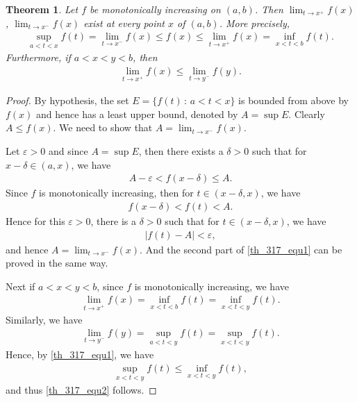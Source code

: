 \documentclass[11pt]{book}
\newtheorem{theorem}{Theorem}[chapter]
\theoremstyle{definition}
\numberwithin{equation}{chapter}
\begin{document}
\begin{theorem}\label{th_317}
Let $f$ be monotonically increasing on $(a,b)$. Then $\lim_{t \to x^{+}} f(x)$, $\lim_{t \to x^{-}} f(x)$ exist at every point $x$ of $(a,b)$. More precisely,
\begin{align}\label{th_317_equ1}
    \sup_{a < t < x} f(t) = \lim_{t \to x^-} f(x) \leq f(x) \leq \lim_{t \to x^+} f(x) = \inf_{x < t < b} f(t).
\end{align}
Furthermore, if $a < x < y < b$, then
\begin{align}\label{th_317_equ2}
    \lim_{t \to x^+} f(x) \leq \lim_{t \to y^-} f(y).
\end{align}
\end{theorem}
\begin{proof}
By hypothesis, the set $E = \{f(t) \,:\, a < t < x\}$ is bounded from above by $f(x)$ and hence has a least upper bound, denoted by $A = \sup E$. Clearly $A \leq f(x)$. We need to show that $A = \lim_{t\to x^-} f(x)$.

Let $\varepsilon > 0$ and since $A = \sup E$, then there exists a $\delta > 0$ such that for $x - \delta \in (a,x)$, we have
\begin{align*}
    A - \varepsilon < f(x - \delta) \leq A.
\end{align*}
Since $f$ is monotonically increasing, then for $t \in (x - \delta, x)$, we have
\begin{align*}
    f(x - \delta) < f(t) < A.
\end{align*}
Hence for this $\varepsilon > 0$, there is a $\delta > 0$ such that for $t \in (x - \delta, x)$, we have
\begin{align*}
    \left|f(t) - A\right| < \varepsilon,
\end{align*}
and hence $A = \lim_{t\to x^-} f(x)$. And the second part of \eqref{th_317_equ1} can be proved in the same way.

Next if $a < x < y < b$, since $f$ is monotonically increasing, we have
\begin{align*}
    \lim_{t\to x^+} f(x) = \inf_{x < t < b} f(t) = \inf_{x < t < y} f(t).
\end{align*}
Similarly, we have
\begin{align*}
    \lim_{t\to y^-} f(y) = \sup_{a < t < y} f(t) = \sup_{x < t < y} f(t).
\end{align*}
Hence, by \eqref{th_317_equ1}, we have
\begin{align*}
    \sup_{x < t < y} f(t) \leq \inf_{x < t < y} f(t),
\end{align*}
and thus \eqref{th_317_equ2} follows.
\end{proof}
\end{document}

